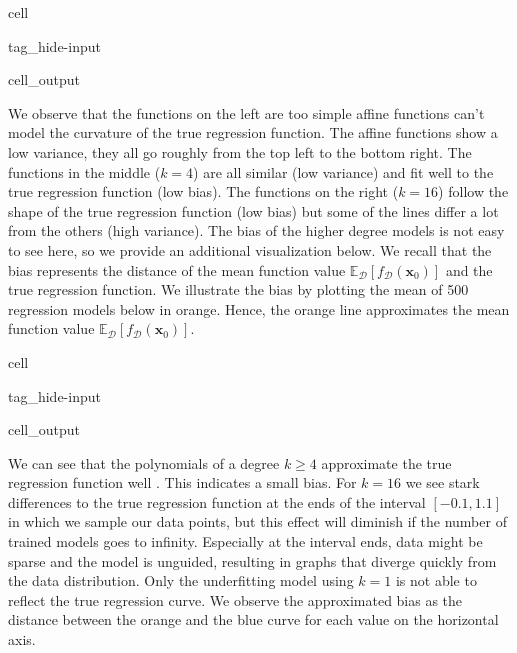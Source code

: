 \documentclass[letterpaper,10pt,english]{jupyterBook}
\begin{document}
\begin{sphinxuseclass}{cell}
\begin{sphinxuseclass}{tag_hide-input}\begin{sphinxVerbatimOutput}

\begin{sphinxuseclass}{cell_output}
\noindent{}

\end{sphinxuseclass}\end{sphinxVerbatimOutput}

\end{sphinxuseclass}
\end{sphinxuseclass}
\sphinxAtStartPar
We observe that the functions on the left are too simple \sphinxhyphen{} affine functions can’t model the curvature of the true regression function. The affine functions show a low variance, they all go roughly from the top left to the bottom right. The functions in the middle (\(k=4\)) are all similar (low variance) and fit well to the true regression function (low bias). The functions on the right (\(k=16\)) follow the shape of the true regression function (low bias) but some of the lines differ a lot from the others (high variance). The bias of the higher degree models is not easy to see here, so we provide an additional visualization below. We recall that the bias represents the distance of the mean function value \(\mathbb{E}_\mathcal{D}[f_\mathcal{D}(\mathbf{x}_0)]\) and the true regression function. We illustrate the bias by plotting the mean of 500 regression models below in orange. Hence, the orange line approximates the mean function value \(\mathbb{E}_\mathcal{D}[f_\mathcal{D}(\mathbf{x}_0)]\).

\begin{sphinxuseclass}{cell}
\begin{sphinxuseclass}{tag_hide-input}\begin{sphinxVerbatimOutput}

\begin{sphinxuseclass}{cell_output}
\noindent{}

\end{sphinxuseclass}\end{sphinxVerbatimOutput}

\end{sphinxuseclass}
\end{sphinxuseclass}
\sphinxAtStartPar
We can see that the polynomials of a degree \(k\geq 4\) approximate the true regression function well . This indicates a small bias. For \(k=16\) we see stark differences to the true regression function at the ends of the interval \([-0.1,1.1]\) in which we sample our data points, but this effect will diminish if the number of trained models goes to infinity. Especially at the interval ends, data might be sparse and the model is unguided, resulting in graphs that diverge quickly from the data distribution. Only the underfitting model using \(k=1\) is not able to reflect the true regression curve. We observe the approximated bias as the distance between the orange and the blue curve for each value on the horizontal axis.
\end{document}
